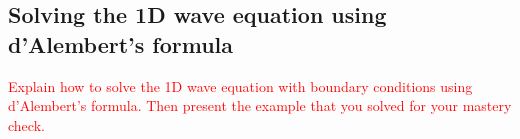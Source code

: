 \documentclass{article}
\newcommand{\red}[1]{\textcolor{red}{#1}}
\begin{document}
\subsection{Solving the 1D wave equation using d'Alembert's formula}
\red{Explain how to solve the 1D wave equation with boundary conditions using d'Alembert's formula. Then present the example that you solved for your mastery check.}


\begin{bibdiv}
\begin{biblist}


\end{biblist}
\end{bibdiv}
\end{document}
